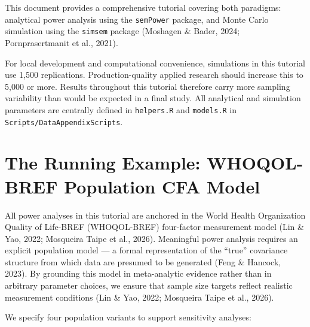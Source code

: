 \documentclass[
  letterpaper,
  DIV=11,
  numbers=noendperiod]{scrartcl}
\begin{document}
This document provides a comprehensive tutorial covering both paradigms:
analytical power analysis using the \texttt{semPower} package, and Monte
Carlo simulation using the \texttt{simsem} package (Moshagen \& Bader,
2024; Pornprasertmanit et al., 2021).

\begin{tcolorbox}[enhanced jigsaw, arc=.35mm, bottomrule=.15mm, bottomtitle=1mm, breakable, colback=white, colbacktitle=quarto-callout-note-color!10!white, colframe=quarto-callout-note-color-frame, coltitle=black, left=2mm, leftrule=.75mm, opacityback=0, opacitybacktitle=0.6, rightrule=.15mm, title=\textcolor{quarto-callout-note-color}{\faInfo}\hspace{0.5em}{Reproducibility Note}, titlerule=0mm, toprule=.15mm, toptitle=1mm]

For local development and computational convenience, simulations in this
tutorial use 1,500 replications. Production-quality applied research
should increase this to 5,000 or more. Results throughout this tutorial
therefore carry more sampling variability than would be expected in a
final study. All analytical and simulation parameters are centrally
defined in \texttt{helpers.R} and \texttt{models.R} in
\texttt{Scripts/DataAppendixScripts}.

\end{tcolorbox}

\section{The Running Example: WHOQOL-BREF Population CFA
Model}\label{sec-popmodel}

All power analyses in this tutorial are anchored in the World Health
Organization Quality of Life-BREF (WHOQOL-BREF) four-factor measurement
model (Lin \& Yao, 2022; {Mosqueira Taipe et al.}, 2026). Meaningful
power analysis requires an explicit population model --- a formal
representation of the ``true'' covariance structure from which data are
presumed to be generated (Feng \& Hancock, 2023). By grounding this
model in meta-analytic evidence rather than in arbitrary parameter
choices, we ensure that sample size targets reflect realistic
measurement conditions (Lin \& Yao, 2022; {Mosqueira Taipe et al.},
2026).

We specify four population variants to support sensitivity analyses:
\end{document}
